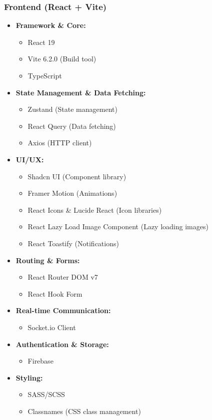\documentclass[a4paper,12pt]{article}
\begin{document}
	\subsubsection{Frontend (React + Vite)}
	\begin{itemize}
		\item \textbf{Framework \& Core:}
		\begin{itemize}
			\item React 19
			\item Vite 6.2.0 (Build tool)
			\item TypeScript
		\end{itemize}
		\item \textbf{State Management \& Data Fetching:}
		\begin{itemize}
			\item Zustand (State management)
			\item React Query (Data fetching)
			\item Axios (HTTP client)
		\end{itemize}
		\item \textbf{UI/UX:}
		\begin{itemize}
			\item Shadcn UI (Component library)
			\item Framer Motion (Animations)
			\item React Icons \& Lucide React (Icon libraries)
			\item React Lazy Load Image Component (Lazy loading images)
			\item React Toastify (Notifications)
		\end{itemize}
		\item \textbf{Routing \& Forms:}
		\begin{itemize}
			\item React Router DOM v7
			\item React Hook Form
		\end{itemize}
		\item \textbf{Real-time Communication:}
		\begin{itemize}
			\item Socket.io Client
		\end{itemize}
		\item \textbf{Authentication \& Storage:}
		\begin{itemize}
			\item Firebase
		\end{itemize}
		\item \textbf{Styling:}
		\begin{itemize}
			\item SASS/SCSS
			\item Classnames (CSS class management)
		\end{itemize}
	\end{itemize}
	
\end{document}
